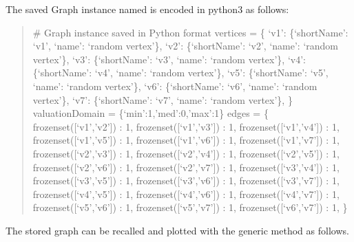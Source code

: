\documentclass[a4paper,12pt,english]{sphinxhowto}
\begin{document}
The saved Graph instance named  is encoded in python3 as follows:

\begin{sphinxVerbatim}[commandchars=\\\{\}]
  
\end{sphinxVerbatim}
\begin{quote}

\# Graph instance saved in Python format
vertices = \{
‘v1’: \{‘shortName’: ‘v1’, ‘name’: ‘random vertex’\},
‘v2’: \{‘shortName’: ‘v2’, ‘name’: ‘random vertex’\},
‘v3’: \{‘shortName’: ‘v3’, ‘name’: ‘random vertex’\},
‘v4’: \{‘shortName’: ‘v4’, ‘name’: ‘random vertex’\},
‘v5’: \{‘shortName’: ‘v5’, ‘name’: ‘random vertex’\},
‘v6’: \{‘shortName’: ‘v6’, ‘name’: ‘random vertex’\},
‘v7’: \{‘shortName’: ‘v7’, ‘name’: ‘random vertex’\},
\}
valuationDomain = \{‘min’:\sphinxhyphen{}1,’med’:0,’max’:1\}
edges = \{
frozenset({[}‘v1’,’v2’{]}) : \sphinxhyphen{}1,
frozenset({[}‘v1’,’v3’{]}) : \sphinxhyphen{}1,
frozenset({[}‘v1’,’v4’{]}) : \sphinxhyphen{}1,
frozenset({[}‘v1’,’v5’{]}) : 1,
frozenset({[}‘v1’,’v6’{]}) : \sphinxhyphen{}1,
frozenset({[}‘v1’,’v7’{]}) : \sphinxhyphen{}1,
frozenset({[}‘v2’,’v3’{]}) : 1,
frozenset({[}‘v2’,’v4’{]}) : 1,
frozenset({[}‘v2’,’v5’{]}) : \sphinxhyphen{}1,
frozenset({[}‘v2’,’v6’{]}) : 1,
frozenset({[}‘v2’,’v7’{]}) : \sphinxhyphen{}1,
frozenset({[}‘v3’,’v4’{]}) : \sphinxhyphen{}1,
frozenset({[}‘v3’,’v5’{]}) : \sphinxhyphen{}1,
frozenset({[}‘v3’,’v6’{]}) : \sphinxhyphen{}1,
frozenset({[}‘v3’,’v7’{]}) : \sphinxhyphen{}1,
frozenset({[}‘v4’,’v5’{]}) : 1,
frozenset({[}‘v4’,’v6’{]}) : \sphinxhyphen{}1,
frozenset({[}‘v4’,’v7’{]}) : 1,
frozenset({[}‘v5’,’v6’{]}) : 1,
frozenset({[}‘v5’,’v7’{]}) : \sphinxhyphen{}1,
frozenset({[}‘v6’,’v7’{]}) : \sphinxhyphen{}1,
\}
\end{quote}

The stored graph can be recalled and plotted with the generic  \sphinxfootnotemark[1] method as follows.

\begin{sphinxVerbatim}[commandchars=\\\{\},numbers=left,firstnumber=1,stepnumber=1]
  
\end{sphinxVerbatim}
\end{document}
